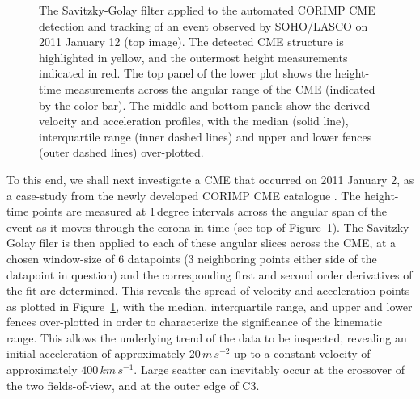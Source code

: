 \documentclass[structabstract]{aa}
\begin{document}
\begin{figure}[!t]
\caption{The Savitzky-Golay filter applied to the automated CORIMP CME detection and tracking of an event observed by SOHO/LASCO on 2011 January 12 (top image). The detected CME structure is highlighted in yellow, and the outermost height measurements indicated in red. The top panel of the lower plot shows the height-time measurements across the angular range of the CME (indicated by the color bar). The middle and bottom panels show the derived velocity and acceleration profiles, with the median (solid line), interquartile range (inner dashed lines) and upper and lower fences (outer dashed lines) over-plotted.}
\label{fig_savgol_CME_CORIMP}
\end{figure}



To this end, we shall next investigate a CME that occurred on 2011 January 2, as a case-study from the newly developed CORIMP CME catalogue \citep{2012ApJ...752..144M, 2012ApJ...752..145B}. The height-time points are measured at 1\,degree intervals across the angular span of the event as it moves through the corona in time (see top of Figure~\ref{fig_savgol_CME_CORIMP}). The Savitzky-Golay filer is then applied to each of these angular slices across the CME, at a chosen window-size of 6 datapoints (3 neighboring points either side of the datapoint in question) and the corresponding first and second order derivatives of the fit are determined. This reveals the spread of velocity and acceleration points as plotted in Figure~\ref{fig_savgol_CME_CORIMP}, with the median, interquartile range, and upper and lower fences over-plotted in order to characterize the significance of the kinematic range. This allows the underlying trend of the data to be inspected, revealing an initial acceleration of approximately $20\,m\,s^{-2}$ up to a constant velocity of approximately $400\,km\,s^{-1}$. Large scatter can inevitably occur at the crossover of the two fields-of-view, and at the outer edge of C3.
\end{document}
